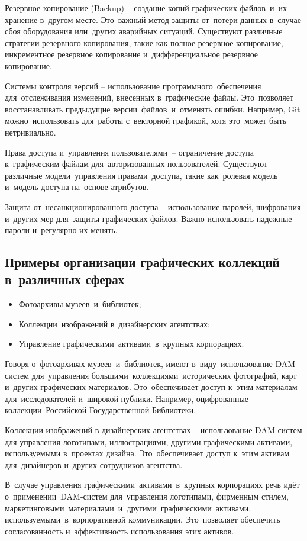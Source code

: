 \documentclass{ou}
\begin{document}
Резервное копирование (Backup) -- создание копий графических файлов~и~их хранение в~другом месте. Это~важный метод защиты от~потери данных в~случае сбоя оборудования или~других аварийных ситуаций. Существуют различные стратегии резервного копирования, такие как полное резервное копирование, инкрементное резервное копирование и~дифференциальное резервное копирование.

Системы контроля версий -- использование программного~обеспечения для~отслеживания изменений, внесенных в~графические файлы. Это~позволяет восстанавливать предыдущие версии~файлов~и~отменять ошибки. Например, Git можно~использовать для~работы с~векторной графикой, хотя это~может быть нетривиально.

Права доступа и~управления пользователями~-- ограничение доступа к~графическим файлам для~авторизованных пользователей. Существуют различные модели~управления правами~доступа, такие как~ролевая модель и~модель доступа на~основе атрибутов.

Защита от~несанкционированного доступа -- использование паролей, шифрования и~других мер для~защиты графических файлов. Важно использовать надежные пароли и~регулярно их менять.
\subsection{Примеры организации графических коллекций в~различных сферах}
\begin{itemize}[label=-, itemindent=2em, nosep]
\item Фотоархивы музеев~и~библиотек;
\item Коллекции~изображений в~дизайнерских агентствах;
\item Управление графическими~активами~в~крупных корпорациях.
\end{itemize}

Говоря о~фотоархивах музеев~и~библиотек, имеют в~виду~использование DAM-систем для~управления большими~коллекциями~исторических фотографий, карт и~других графических материалов. Это~обеспечивает доступ к~этим материалам для~исследователей и~широкой публики. Например, оцифрованные коллекции~Российской Государственной Библиотеки.

Коллекции изображений в дизайнерских агентствах -- использование DAM-систем для управления логотипами, иллюстрациями, другими графическими активами, используемыми в~проектах дизайна. Это~обеспечивает доступ к~этим активам для~дизайнеров и~других сотрудников агентства.

В~случае управления графическими~активами~в~крупных корпорациях речь идёт о~применении~DAM-систем для~управления логотипами, фирменным стилем, маркетинговыми~материалами~и~другими~графическими~активами, используемыми~в~корпоративной коммуникации. Это~позволяет обеспечить согласованность и~эффективность использования этих активов.
\end{document}
